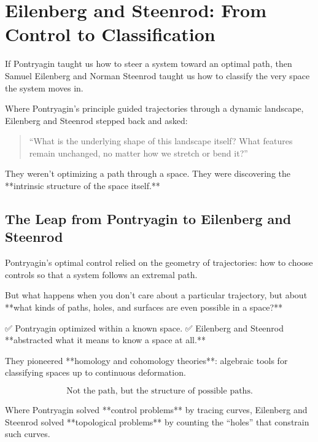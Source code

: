 \section{Eilenberg and Steenrod: From Control to Classification}

If Pontryagin taught us how to steer a system toward an optimal path,  
then Samuel Eilenberg and Norman Steenrod taught us how to classify the very space the system moves in.

Where Pontryagin’s principle guided trajectories through a dynamic landscape,  
Eilenberg and Steenrod stepped back and asked:

\begin{quote}
“What is the underlying shape of this landscape itself?  
What features remain unchanged, no matter how we stretch or bend it?”
\end{quote}

They weren’t optimizing a path through a space.  
They were discovering the **intrinsic structure of the space itself.**

\bigskip

\subsection*{The Leap from Pontryagin to Eilenberg and Steenrod}

Pontryagin’s optimal control relied on the geometry of trajectories:  
how to choose controls so that a system follows an extremal path.

But what happens when you don’t care about a particular trajectory,  
but about **what kinds of paths, holes, and surfaces are even possible in a space?**

✅ Pontryagin optimized within a known space.  
✅ Eilenberg and Steenrod **abstracted what it means to know a space at all.**

They pioneered **homology and cohomology theories**:  
algebraic tools for classifying spaces up to continuous deformation.

\[
\boxed{\text{Not the path, but the structure of possible paths.}}
\]

Where Pontryagin solved **control problems** by tracing curves,  
Eilenberg and Steenrod solved **topological problems** by counting the “holes” that constrain such curves.

\bigskip

